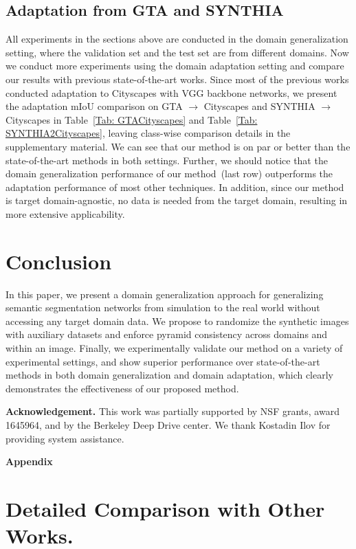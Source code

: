 \documentclass[10pt,twocolumn,letterpaper]{article}
\begin{document}
\subsection{Adaptation from GTA and SYNTHIA}
\label{subsec:adaptation}
All experiments in the sections above are conducted in the domain generalization setting, where the validation set and the test set are from different domains. Now we conduct more experiments using the domain adaptation setting and compare our results with previous state-of-the-art works. Since most of the previous works conducted adaptation to Cityscapes with VGG backbone networks, we present the adaptation mIoU comparison on GTA $\rightarrow$ Cityscapes  and SYNTHIA $\rightarrow$ Cityscapes in Table~\ref{Tab: GTACityscapes} and Table~\ref{Tab: SYNTHIA2Cityscapes}, leaving class-wise comparison details in the supplementary material. We can see that our method is on par or better than the state-of-the-art methods in both settings. Further, we should notice that the domain generalization performance of our method~(last row) outperforms the adaptation performance of most other techniques.  In addition, since our method is target domain-agnostic, no data is needed from the target domain, resulting in more extensive applicability. 


\section{Conclusion}
In this paper, we present a domain generalization approach for generalizing semantic segmentation networks from simulation to the real world without accessing any target domain data. We propose to randomize the synthetic images with auxiliary datasets and enforce pyramid consistency across domains and within an image. Finally, we experimentally validate our method on a variety of experimental settings, and show superior performance over state-of-the-art methods in both domain generalization and domain adaptation, which clearly demonstrates the effectiveness of our proposed method.

\textbf{Acknowledgement.} This work was partially supported by NSF grants, award 1645964, and by the Berkeley Deep Drive center. We thank Kostadin Ilov for providing system assistance.
{\small


}

\clearpage
\appendix
\noindent\textbf{\Large Appendix}
\section{Detailed Comparison with Other Works.}
\end{document}
